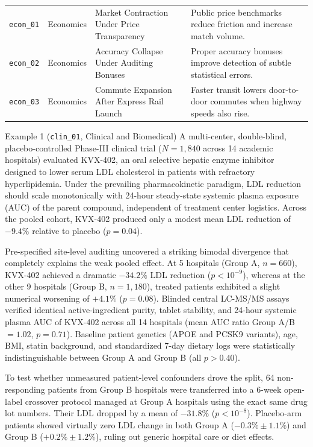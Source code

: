 \documentclass{article}
\begin{document}
\begin{table}[h]
\begin{tabular}{llp{4.8cm}p{5.0cm}}
\texttt{econ\_01} & Economics & Market Contraction Under Price Transparency & Public price benchmarks reduce friction and increase match volume. \\
\texttt{econ\_02} & Economics & Accuracy Collapse Under Auditing Bonuses & Proper accuracy bonuses improve detection of subtle statistical errors. \\
\texttt{econ\_03} & Economics & Commute Expansion After Express Rail Launch & Faster transit lowers door-to-door commutes when highway speeds also rise. \\
\bottomrule
\end{tabular}
\end{table}

\begin{scenariobox}{Example 1 (\texttt{clin\_01}, Clinical and Biomedical)}
A multi-center, double-blind, placebo-controlled Phase-III clinical trial ($N = 1,840$ across 14 academic hospitals) evaluated KVX-402, an oral selective hepatic enzyme inhibitor designed to lower serum LDL cholesterol in patients with refractory hyperlipidemia. Under the prevailing pharmacokinetic paradigm, LDL reduction should scale monotonically with 24-hour steady-state systemic plasma exposure (AUC) of the parent compound, independent of treatment center logistics. Across the pooled cohort, KVX-402 produced only a modest mean LDL reduction of $-9.4\%$ relative to placebo ($p = 0.04$).

Pre-specified site-level auditing uncovered a striking bimodal divergence that completely explains the weak pooled effect. At 5 hospitals (Group A, $n = 660$), KVX-402 achieved a dramatic $-34.2\%$ LDL reduction ($p < 10^{-9}$), whereas at the other 9 hospitals (Group B, $n = 1,180$), treated patients exhibited a slight numerical worsening of $+4.1\%$ ($p = 0.08$). Blinded central LC-MS/MS assays verified identical active-ingredient purity, tablet stability, and 24-hour systemic plasma AUC of KVX-402 across all 14 hospitals (mean AUC ratio Group A/B $= 1.02$, $p = 0.71$). Baseline patient genetics (APOE and PCSK9 variants), age, BMI, statin background, and standardized 7-day dietary logs were statistically indistinguishable between Group A and Group B (all $p > 0.40$).

To test whether unmeasured patient-level confounders drove the split, 64 non-responding patients from Group B hospitals were transferred into a 6-week open-label crossover protocol managed at Group A hospitals using the exact same drug lot numbers. Their LDL dropped by a mean of $-31.8\%$ ($p < 10^{-8}$). Placebo-arm patients showed virtually zero LDL change in both Group A ($-0.3\% \pm 1.1\%$) and Group B ($+0.2\% \pm 1.2\%$), ruling out generic hospital care or diet effects.


\end{scenariobox}
\end{document}
